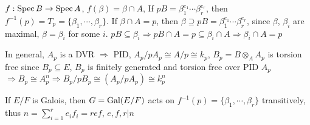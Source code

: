 \documentclass[../main.tex]{subfiles}
\begin{document}
\begin{example}
$f:\operatorname{Spec} B\to\operatorname{Spec} A$, $f(\beta)=\beta\cap A$, If $pB=\beta_1^{e_1}\cdots\beta_r^{e_r}$, then $f^{-1}(p)=T_p=\{\beta_1,\cdots,\beta_r\}$. If $\beta\cap A=p$, then $\beta\supseteq pB=\beta_1^{e_1}\cdots\beta_r^{e_r}$, since $\beta$, $\beta_i$ are maximal, $\beta=\beta_i$ for some $i$. $pB\subseteq\beta_i\Rightarrow pB\cap A=p\subseteq\beta_i\cap A\Rightarrow\beta_i\cap A=p$
\begin{center}
\end{center}
In general, $A_p$ is a DVR $\Rightarrow$ PID, $A_p/pA_p\cong A/p\cong k_p$, $B_p=B\otimes_AA_p$ is torsion free since $B_p\subseteq E$, $B_p$ is finitely generated and torsion free over PID $A_p$ $\Rightarrow B_p\cong A_p^n\Rightarrow B_p/pB_p\cong(A_p/pA_p)\cong k_p^n$
\end{example}

\begin{theorem}
If $E/F$ is Galois, then $G=\operatorname{Gal}(E/F)$ acts on $f^{-1}(p)=\{\beta_1,\cdots,\beta_r\}$ transitively, thus $n=\sum_{i=1}^re_if_i=ref$, $e,f,r|n$
\end{theorem}
\end{document}
